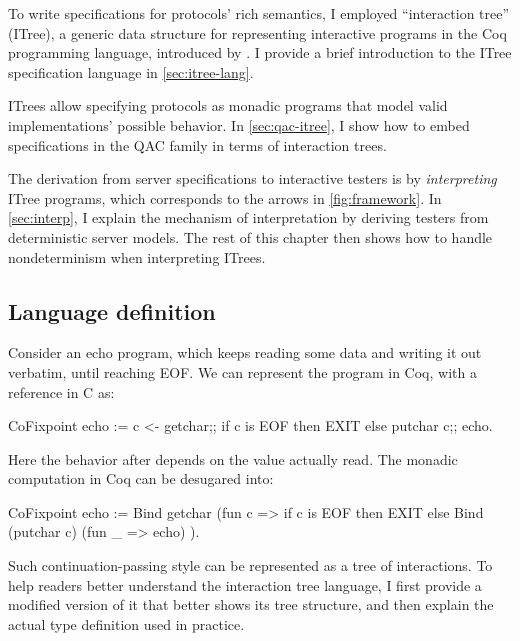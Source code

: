 To write specifications for protocols' rich semantics, I employed ``interaction
tree'' (ITree), a generic data structure for representing interactive programs
in the Coq programming language, introduced by \citet{itree}.  I provide a brief
introduction to the ITree specification language in \autoref{sec:itree-lang}.

ITrees allow specifying protocols as monadic programs that model valid
implementations' possible behavior.  In \autoref{sec:qac-itree}, I show how to
embed specifications in the QAC family in terms of interaction trees.

The derivation from server specifications to interactive testers is by {\em
interpreting} ITree programs, which corresponds to the arrows
in \autoref{fig:framework}.  In \autoref{sec:interp}, I explain the mechanism of
interpretation by deriving testers from deterministic server models.  The rest
of this chapter then shows how to handle nondeterminism when interpreting
ITrees.

\subsection{Language definition}
\label{sec:itree-lang}
Consider an echo program, which keeps reading some data and writing it out
verbatim, until reaching EOF.  We can represent the program in Coq, with a
reference in C as:
\begin{multicols}{2}
\begin{coq}
  CoFixpoint echo :=
    c <- getchar;;
    if c is EOF
    then EXIT
    else
      putchar c;;
      echo.
\end{coq}
\columnbreak
\begin{cpp}
  void echo() {
    const char c = getchar();
    if (c == EOF)
      return;
    else {
      putchar(c);
      echo();
    }
\end{cpp}
\end{multicols}
Here the behavior after  depends on the value actually read.  The
monadic computation in Coq can be desugared into:
\begin{coq}
  CoFixpoint echo :=
    Bind getchar
         (fun c => if c is EOF
                 then EXIT
                 else Bind (putchar c)
                           (fun _ => echo)
         ).
\end{coq}
Such continuation-passing style can be represented as a tree of interactions.
To help readers better understand the interaction tree language, I first provide
a modified version of it that better shows its tree structure, and then explain
the actual type definition used in practice.

